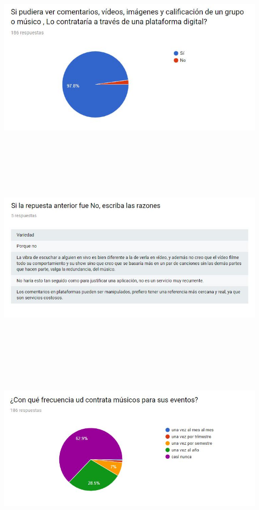 \begin{center}
\includegraphics[width=16cm, height=10cm,keepaspectratio=true]{Desarrollo/RecoleccionInformacion/imgs/9.JPG}
\includegraphics[width=16cm, height=10cm,keepaspectratio=true]{Desarrollo/RecoleccionInformacion/imgs/10.JPG}
\includegraphics[width=16cm, height=10cm,keepaspectratio=true]{Desarrollo/RecoleccionInformacion/imgs/11.JPG}
\end{center}

